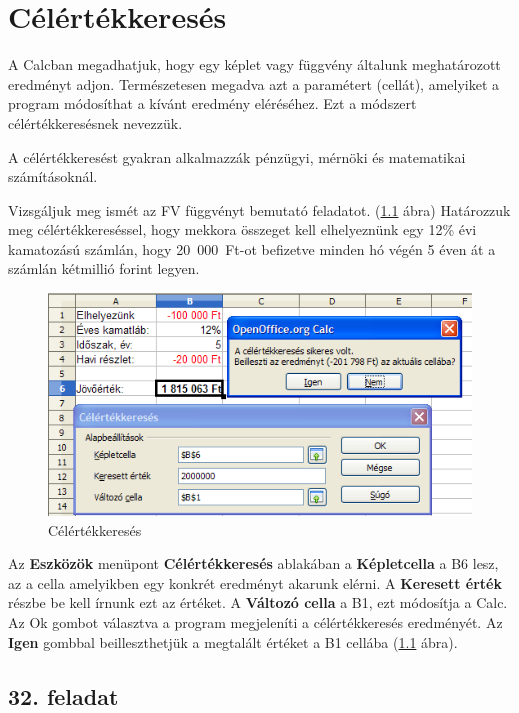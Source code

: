\chapter{Célértékkeresés}
\thispagestyle{empty}

A Calcban megadhatjuk, hogy egy képlet vagy függvény általunk
meghatározott eredményt adjon. Természetesen megadva azt a
paramétert (cellát), amelyiket a program módosíthat a
kívánt eredmény eléréséhez. Ezt a módszert célértékkeresésnek nevezzük.

A célértékkeresést gyakran alkalmazzák pénzügyi,
mérnöki és matematikai számításoknál.

Vizsgáljuk meg ismét az FV függvényt bemutató feladatot. 
(\ref{Célértékkeresés} ábra) Határozzuk meg célértékkereséssel,
hogy mekkora összeget kell elhelyeznünk egy 12\% évi kamatozású
számlán,  hogy 20~000~Ft-ot befizetve minden hó végén 5
éven át a számlán kétmillió forint legyen.

\begin{figure}[!h]
\begin{center}
\includegraphics[width=13.73cm]{oocalcv1-img140.png}
\caption{Célértékkeresés}\label{Célértékkeresés}
\end{center}
\end{figure}

Az \textbf{Eszközök} menüpont \textbf{Célértékkeresés}
ablakában a \textbf{Képletcella} a B6 lesz, az a cella amelyikben
egy konkrét eredményt akarunk elérni. A \textbf{Keresett
érték} részbe be kell írnunk ezt az értéket. A
\textbf{Változó cella} a B1, ezt módosítja a Calc. Az Ok gombot
választva a  program megjeleníti a célértékkeresés
eredményét. Az \textbf{Igen} gombbal beilleszthetjük a
megtalált értéket a B1 cellába (\ref{Célértékkeresés} ábra).


\section{32. feladat}


